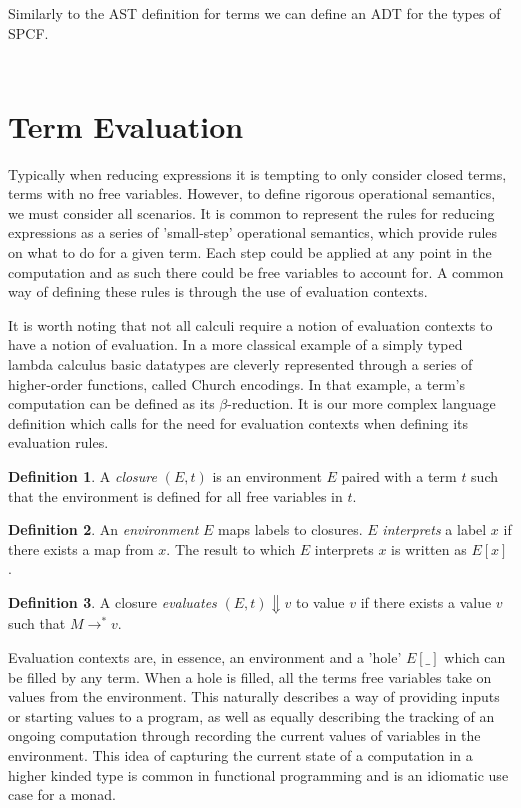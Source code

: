\documentclass[12pt,a4paper]{report}
\theoremstyle{definition}
\newtheorem{definition}{Definition}[chapter]%
\theoremstyle{remark}
\begin{document}
Similarly to the AST definition for terms we can define an ADT for the types of SPCF.

$\frac{}{}$

\section{Term Evaluation}\label{section: evaluation}
Typically when reducing expressions it is tempting to only consider closed terms, terms with no free variables. However, to define rigorous operational semantics, we must consider all scenarios. It is common to represent the rules for reducing expressions as a series of 'small-step' operational semantics, which provide rules on what to do for a given term. Each step could be applied at any point in the computation and as such there could be free variables to account for. A common way of defining these rules is through the use of evaluation contexts.

It is worth noting that not all calculi require a notion of evaluation contexts to have a notion of evaluation. In a more classical example of a simply typed lambda calculus basic datatypes are cleverly represented through a series of higher-order functions, called Church encodings. In that example, a term's computation can be defined as its $\beta$-reduction. It is our more complex language definition which calls for the need for evaluation contexts when defining its evaluation rules.

\begin{definition}
    A \emph{closure} $(E, t)$ is an environment $E$ paired with a term $t$ such that the environment is defined for all free variables in $t$.
\end{definition}

\begin{definition}\label{def: environment}
    An \emph{environment} $E$ maps labels to closures. $E$ \emph{interprets} a label $x$ if there exists a map from $x$. The result to which $E$ interprets $x$ is written as $E[x]$.
\end{definition}

\begin{definition}
    A closure \emph{evaluates} $(E, t) \Downarrow v$ to value $v$ if there exists a value $v$ such that $M \rightarrow^* v$.
\end{definition}

Evaluation contexts are, in essence, an environment and a 'hole' $E[\_]$ which can be filled by any term. When a hole is filled, all the terms free variables take on values from the environment. This naturally describes a way of providing inputs or starting values to a program, as well as equally describing the tracking of an ongoing computation through recording the current values of variables in the environment. This idea of capturing the current state of a computation in a higher kinded type is common in functional programming and is an idiomatic use case for a monad.
\end{document}
